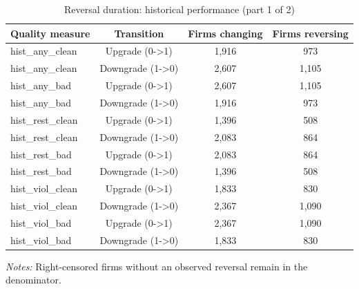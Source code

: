 \begin{table}[htbp]
\footnotesize
\centering
\caption{Reversal duration: historical performance (part 1 of 2)}
\begin{threeparttable}
\begin{tabular}{p{}ccc}
\toprule
Quality measure & Transition & Firms changing & Firms reversing \\
\midrule
hist\_any\_clean & Upgrade (0->1) & 1,916 & 973 \\
hist\_any\_clean & Downgrade (1->0) & 2,607 & 1,105 \\
hist\_any\_bad & Upgrade (0->1) & 2,607 & 1,105 \\
hist\_any\_bad & Downgrade (1->0) & 1,916 & 973 \\
hist\_rest\_clean & Upgrade (0->1) & 1,396 & 508 \\
hist\_rest\_clean & Downgrade (1->0) & 2,083 & 864 \\
hist\_rest\_bad & Upgrade (0->1) & 2,083 & 864 \\
hist\_rest\_bad & Downgrade (1->0) & 1,396 & 508 \\
hist\_viol\_clean & Upgrade (0->1) & 1,833 & 830 \\
hist\_viol\_clean & Downgrade (1->0) & 2,367 & 1,090 \\
hist\_viol\_bad & Upgrade (0->1) & 2,367 & 1,090 \\
hist\_viol\_bad & Downgrade (1->0) & 1,833 & 830 \\
\bottomrule
\end{tabular}
\begin{tablenotes}\footnotesize
\item \raggedright \textit{Notes:} Right-censored firms without an observed reversal remain in the denominator.
\end{tablenotes}
\end{threeparttable}
\end{table}

